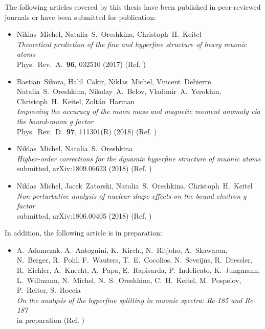 \ifthispageodd{}{\cleardoublepage}


\noindent \normalfont
The following articles covered by this thesis have been published in peer-reviewed \\journals or have been submitted for publication:

\begin{itemize}
\item Niklas~Michel, Natalia~S.~Oreshkina, Christoph~H.~Keitel \\ 
\textit{Theoretical prediction of the fine and hyperfine structure of heavy muonic atoms} \\ 
Phys.~Rev.~A.~\textbf{96}, 032510 (2017) (Ref. \cite{michel2017})\vspace*{5pt} \\
%
\item Bastian~Sikora, Halil~Cakir, Niklas~Michel, Vincent~Debierre, Natalia~S.~Oreshkina, Nikolay~A.~Belov, Vladimir~A.~Yerokhin, Christoph~H.~Keitel, Zoltán~Harman \\ 
\textit{Improving the accuracy of the muon mass and magnetic moment anomaly via the bound-muon g factor} \\ 
Phys.~Rev.~D.~\textbf{97}, 111301(R) (2018) (Ref. \cite{sikora2018}) \vspace*{5pt} \\
\item Niklas~Michel, Natalia~S.~Oreshkina \\ 
\textit{Higher-order corrections for the dynamic hyperfine structure of muonic atoms}\\
submitted, arXiv:1809.06623 (2018) (Ref. \cite{michel_muonHO}) \vspace*{5pt} \\
\item Niklas~Michel, Jacek~Zatorski, Natalia~S.~Oreshkina, Christoph~H.~Keitel \\ 
\textit{Non-perturbative analysis of nuclear shape effects on the bound electron g factor}\\
submitted, arXiv:1806.00405 (2018) (Ref. \cite{michel_nuclDef}) \vspace*{5pt} \\
\end{itemize} 

\vspace{0.7cm}

\noindent
In addition, the following article is in preparation:

\begin{itemize}
\item A.~Adamczak, A.~Antognini, K.~Kirch., N.~Ritjoho, A.~Skawaran, N.~Berger, R.~Pohl, F.~Wauters, T.~E.~Cocolios, N.~Seveijns, R.~Dressler, R.~Eichler, A.~Knecht, A.~Papa, E.~Rapisarda, P.~Indelicato, K.~Jungmann, L.~Willmann, N.~Michel, N.~S.~Oreshkina, C.~H.~Keitel, M.~Pospelov, P.~Reiter, S.~Roccia\\ 
\textit{On the analysis of the hyperfine splitting in muonic spectra:
Re-185 and Re-187} \\ 
in preparation (Ref. \cite{psiReDraft}) \vspace*{5pt} \\
\end{itemize} 


